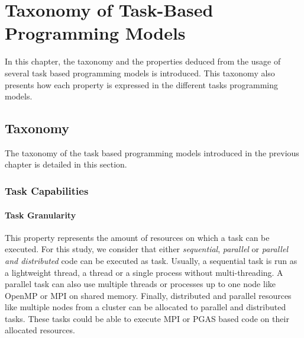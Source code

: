 \chapter{Taxonomy of Task-Based Programming Models}
\label{chap:taxonomy}

In this chapter, the taxonomy and the properties deduced from the usage of several task based programming models is introduced.
This taxonomy also presents how each property is expressed in the different tasks programming models.

\section{Taxonomy}
The taxonomy of the task based programming models introduced in the previous chapter is detailed in this section.

\subsection{Task Capabilities}

\subsubsection{Task Granularity}
This property represents the amount of resources on which a task can be executed.
For this study, we consider that either \textit{sequential}, \textit{parallel} or \textit{parallel and distributed} code can be executed as task.
Usually, a sequential task is run as a lightweight thread, a thread or a single process without multi-threading.
A parallel task can also use multiple threads or processes up to one node like OpenMP or MPI on shared memory.
Finally, distributed and parallel resources like multiple nodes from a cluster can be allocated to parallel and distributed tasks.
These tasks could be able to execute MPI or PGAS based code on their allocated resources.

